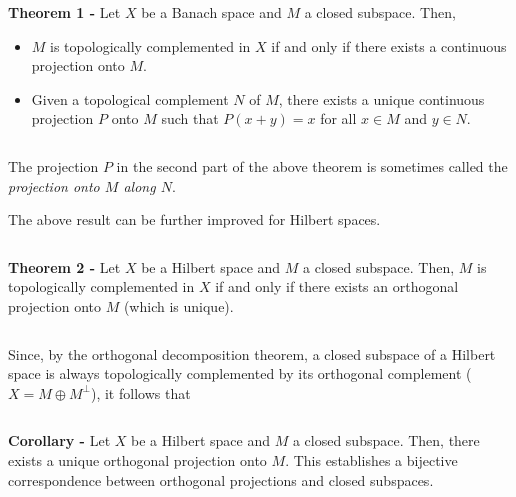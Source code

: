 \documentclass[12pt]{article}
\begin{document}
{\bf Theorem  1 -} Let $X$ be a Banach space and $M$ a closed subspace. Then,
\begin{itemize}
\item $M$ is topologically complemented in $X$ if and only if there exists a continuous projection onto $M$.
\end{itemize}
\begin{itemize}
\item Given a topological complement $N$ of $M$, there exists a unique continuous projection $P$ onto $M$ such that $P(x+y)=x$ for all $x \in M$ and $y \in N$.
\end{itemize}


$\;$

The projection $P$ in the second part of the above theorem is sometimes called the \emph{projection onto $M$ along $N$}.

The above result can be further improved for Hilbert spaces. 


$\,$


{\bf Theorem 2 - } Let $X$ be a Hilbert space and $M$ a closed subspace. Then, $M$ is topologically complemented in $X$ if and only if there exists an orthogonal projection onto $M$ (which is unique).

$\,$

Since, by the orthogonal decomposition theorem, a closed subspace of a Hilbert space is always topologically complemented by its orthogonal complement ($X=M \oplus M^{\perp}$), it follows that

$\,$

{\bf Corollary -} Let $X$ be a Hilbert space and $M$ a closed subspace. Then, there exists a unique orthogonal projection onto $M$. This establishes a bijective correspondence between orthogonal projections and closed subspaces.
\end{document}
